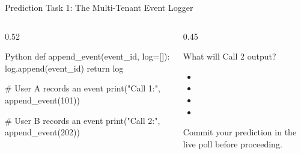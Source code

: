 

\begin{frame}[fragile]{Prediction Task 1: The Multi-Tenant Event Logger}
  \begin{columns}[T,onlytextwidth]
    \begin{column}{0.52\textwidth}
      \begin{CodeBlock}{Python}
def append_event(event_id, log=[]):
    log.append(event_id)
    return log

# User A records an event
print("Call 1:", append_event(101))

# User B records an event
print("Call 2:", append_event(202))
      \end{CodeBlock}
    \end{column}
    \begin{column}{0.45\textwidth}
      \begin{QuestionBox}{What will Call 2 output?}
        \begin{itemize}\setlength{\itemsep}{0.12cm}
          \item[\textbf{A)}] 
          \item[\textbf{B)}] 
          \item[\textbf{C)}] 
          \item[\textbf{D)}] 
        \end{itemize}
      \end{QuestionBox}
      \vspace{0.10cm}
      {\scriptsize\color{UpGradSlate}Commit your prediction in the live poll before proceeding.}
    \end{column}
  \end{columns}
\end{frame}

